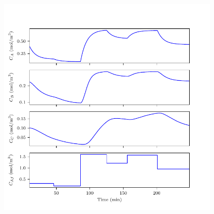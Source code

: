 \documentclass{article}
\begin{document}
\begin{figure}
  \centering
  \includegraphics[page=2, width=\textwidth]{tworeac_plots.pdf}
\end{figure}

\end{document}
